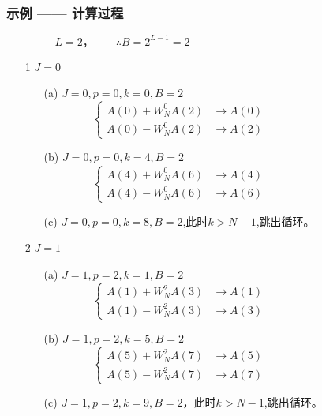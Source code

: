 \documentclass[notheorems,compress,mathserif,table]{beamer}
\begin{document}
\begin{frame}[allowframebreaks]\frametitle{示例 —— 计算过程}%
$$L=2，\quad\quad\therefore B=2^{L-1}=2\quad\quad\quad\quad\quad\quad\quad\quad\quad\quad\quad\quad\quad\quad\quad$$

\begin{enumerate}
  \item [1] $J=0$
      \begin{enumerate}
      \item [(a)] $J=0,p=0,k=0,B=2$
                $$
                    \left\{ \begin{aligned}
                    A(0) + W_N^{0}A(2) &\longrightarrow A(0)\quad\quad\quad\quad\quad\quad\quad\quad \\
                    A(0) - W_N^{0}A(2) &\longrightarrow A(2)
                    \end{aligned} \right.
                $$
      \item [(b)] $J=0,p=0,k=4,B=2$
                $$
                    \left\{ \begin{aligned}
                    A(4) + W_N^{0}A(6) &\longrightarrow A(4)\quad\quad\quad\quad\quad\quad\quad\quad \\
                    A(4) - W_N^{0}A(6) &\longrightarrow A(6)
                    \end{aligned} \right.
                $$
      \item [(c)] $J=0,p=0,k=8,B=2$,此时$ k> N-1 $,跳出循环。
      \end{enumerate}
      \newpage
  \item [2] $J=1$
      \begin{enumerate}
      \item [(a)]$J=1,p=2,k=1,B=2$
                $$
                    \left\{ \begin{aligned}
                    A(1) + W_N^{2}A(3) &\longrightarrow A(1)\quad\quad\quad\quad\quad\quad\quad\quad \\
                    A(1) - W_N^{2}A(3) &\longrightarrow A(3)
                    \end{aligned} \right.
                $$                
      \item [(b)]$J=1,p=2,k=5,B=2$
                $$
                    \left\{ \begin{aligned}
                    A(5) + W_N^{2}A(7) &\longrightarrow A(5)\quad\quad\quad\quad\quad\quad\quad\quad \\
                    A(5) - W_N^{2}A(7) &\longrightarrow A(7)
                    \end{aligned} \right.
                $$
      \item [(c)]$J=1,p=2,k=9,B=2$，此时$ k> N-1 $,跳出循环。
      \end{enumerate}
\end{enumerate}
\end{frame}
\end{document}

